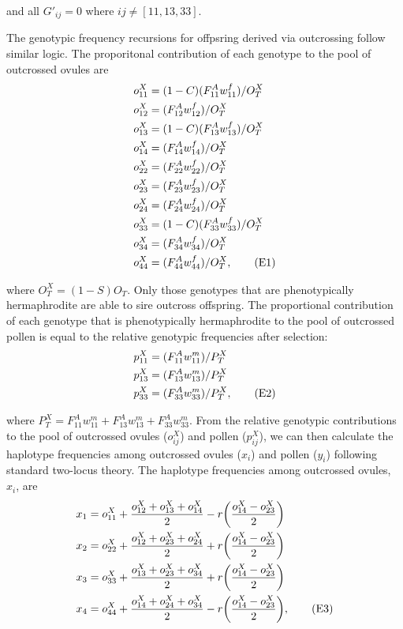 \documentclass{article}
\newcommand\numberthis{\addtocounter{equation}{1}\tag{\theequation}}
\begin{document}
\noindent and all $G'_{ij} = 0$ where $ij \neq [11,13,33]$.

The genotypic frequency recursions for offpsring derived via outcrossing follow similar logic. The proporitonal contribution of each genotype to the pool of outcrossed ovules are
\begin{align*}
    o^X_{11} &= (1 - C) (F^A_{11} w^f_{11})/O^X_T \\
    o^X_{12} &= (F^A_{12} w^f_{12})/O^X_T \\
    o^X_{13} &= (1 - C) (F^A_{13} w^f_{13})/O^X_T \\
    o^X_{14} &= (F^A_{14} w^f_{14})/O^X_T \\
    o^X_{22} &= (F^A_{22} w^f_{22})/O^X_T \\
    o^X_{23} &= (F^A_{23} w^f_{23})/O^X_T \\
    o^X_{24} &= (F^A_{24} w^f_{24})/O^X_T \\
    o^X_{33} &= (1 - C) (F^A_{33} w^f_{33})/O^X_T \\
    o^X_{34} &= (F^A_{34} w^f_{34})/O^X_T \\
    o^X_{44} &= (F^A_{44} w^f_{44})/O^X_T, \numberthis
\end{align*}

\noindent where $O^X_T = (1 - S)O_T$. Only those genotypes that are phenotypically hermaphrodite are able to sire outcross offspring. The proportional contribution of each genotype  that is phenotypically hermaphrodite to the pool of outcrossed pollen is equal to the relative genotypic frequencies after selection:
\begin{align*}
    p^X_{11} &= (F^A_{11} w^m_{11}) / P^X_T \\
    p^X_{13} &= (F^A_{13} w^m_{13}) / P^X_T \\
    p^X_{33} &= (F^A_{33} w^m_{33}) / P^X_T, \numberthis
\end{align*}

\noindent where $P^X_T = F^A_{11} w^m_{11} + F^A_{13} w^m_{13} + F^A_{33} w^m_{33}$. From the relative genotypic contributions to the pool of outcrossed ovules ($o^X_{ij}$) and pollen ($p^X_{ij}$), we can then calculate the haplotype frequencies among outcrossed ovules ($x_i$) and pollen ($y_i$) following standard two-locus theory. The haplotype frequencies among outcrossed ovules, $x_i$, are
\begin{align*} 
    x_{1} &= o^X_{11} + \frac{o^X_{12} + o^X_{13} + o^X_{14}}{2} - r \bigg( \frac{o^X_{14} - o^X_{23}}{2} \bigg)  \\
    x_{2} &= o^X_{22} + \frac{o^X_{12} + o^X_{23} + o^X_{24}}{2} + r \bigg( \frac{o^X_{14} - o^X_{23}}{2} \bigg)  \\
    x_{3} &= o^X_{33} + \frac{o^X_{13} + o^X_{23} + o^X_{34}}{2} + r \bigg( \frac{o^X_{14} - o^X_{23}}{2} \bigg)  \\
    x_{4} &= o^X_{44} + \frac{o^X_{14} + o^X_{24} + o^X_{34}}{2} - r \bigg( \frac{o^X_{14} - o^X_{23}}{2} \bigg),  \numberthis
\end{align*}
\end{document}
